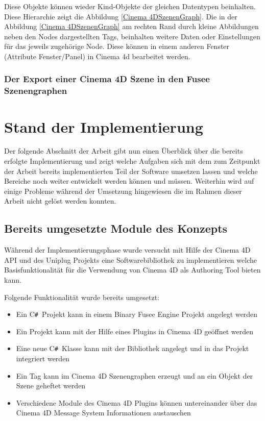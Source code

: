 \documentclass[pagesize, paper=a4, fontsize=12pt, titlepage=true, headings=small, headnosepline, abstractoff, liststotoc, nochapterprefix, plainheadsepline, twoside]{scrreprt}
\newcommand{\CSS}{C\texttt{\# }}
\begin{document}
Diese Objekte können wieder Kind-Objekte der gleichen Datentypen beinhalten. Diese Hierarchie zeigt die Abbildung \ref{Cinema 4DSzenenGraph}. Die in der Abbildung \ref{Cinema 4DSzenenGraph} am rechten Rand durch kleine Abbildungen neben den Nodes dargestellten Tags, beinhalten weitere Daten oder Einstellungen für das jeweils zugehörige Node. Diese können in einem anderen Fenster (Attribute Fenster/Panel) in Cinema 4d bearbeitet werden.

\subsubsection{Der Export einer Cinema 4D Szene in den Fusee Szenengraphen}

\section{Stand der Implementierung}
Der folgende Abschnitt der Arbeit gibt nun einen Überblick über die bereits erfolgte Implementierung und zeigt welche Aufgaben sich mit dem zum Zeitpunkt der Arbeit bereits implementierten Teil der Software umsetzen lassen und welche Bereiche noch weiter entwickelt werden können und müssen. Weiterhin wird auf einige Probleme während der Umsetzung hingewiesen die im Rahmen dieser Arbeit nicht gelöst werden konnten.

\subsection{Bereits umgesetzte Module des Konzepts}
Während der Implementierungsphase wurde versucht mit Hilfe der Cinema 4D API und des Uniplug Projekts eine Softwarebibliothek zu implementieren welche Basisfunktionalität für die Verwendung von Cinema 4D als Authoring Tool bieten kann. 

Folgende Funktionalität wurde bereits umgesetzt:
\begin{itemize}
\item Ein \CSS Projekt kann in einem Binary Fusee Engine Projekt angelegt werden
\item Ein Projekt kann mit der Hilfe eines Plugins in Cinema 4D geöffnet werden
\item Eine neue \CSS Klasse kann mit der Bibliothek angelegt und in das Projekt integriert werden
\item Ein Tag kann im Cinema 4D Szenengraphen erzeugt und an ein Objekt der Szene geheftet werden
\item Verschiedene Module des Cinema 4D Plugins können untereinander über das Cinema 4D Message System Informationen austauschen
\end{itemize}
\end{document}
